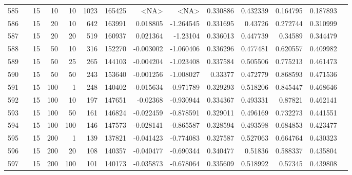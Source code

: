 \begin{longtable}{llrrrrrrrrrrrr}
		585 & \multirow[t]{56}{*}{\rotatebox[origin=r]{90}{use-lexrank-weighted}} &           15 &                10 &           10 &        1023 &     165425 &      <NA> &      <NA> &  0.330886 &    0.432339 &       0.164795 &  0.187893 \\
		586 & &           15 &                20 &           10 &         642 &     163991 &  0.018805 & -1.264545 &  0.331695 &     0.43726 &       0.272744 &  0.310999 \\
		587 & &           15 &                20 &           20 &         519 &     160937 &  0.021364 &  -1.23104 &  0.336013 &    0.447739 &        0.34589 &  0.344479 \\
		588 & &           15 &                50 &           10 &         316 &     152270 & -0.003002 & -1.060406 &  0.336296 &    0.477481 &       0.620557 &  0.409982 \\
		589 & &           15 &                50 &           25 &         265 &     144103 & -0.004204 & -1.023408 &  0.337584 &    0.505506 &       0.775213 &  0.461473 \\
		590 & &           15 &                50 &           50 &         243 &     153640 & -0.001256 & -1.008027 &   0.33377 &    0.472779 &       0.868593 &  0.471536 \\
		591 & &           15 &               100 &            1 &         248 &     140402 & -0.015634 & -0.971789 &  0.329293 &    0.518206 &       0.845447 &  0.468646 \\
		592 & &           15 &               100 &           10 &         197 &     147651 &  -0.02368 & -0.930944 &  0.334367 &    0.493331 &        0.87821 &  0.462141 \\
		593 & &           15 &               100 &           50 &         161 &     146824 & -0.022459 & -0.878591 &  0.329011 &    0.496169 &       0.732273 &  0.441551 \\
		594 & &           15 &               100 &          100 &         146 &     147573 & -0.028141 & -0.865587 &  0.328594 &    0.493598 &       0.684853 &  0.423477 \\
		595 & &           15 &               200 &            1 &         139 &     137821 & -0.041423 & -0.774083 &  0.327587 &    0.527063 &       0.664764 &  0.430323 \\
		596 & &           15 &               200 &           20 &         108 &     140357 & -0.040477 & -0.690344 &  0.340477 &     0.51836 &       0.588337 &  0.435804 \\
		597 & &           15 &               200 &          100 &         101 &     140173 & -0.035873 & -0.678064 &  0.335609 &    0.518992 &        0.57345 &  0.439808 \\

\end{longtable}
